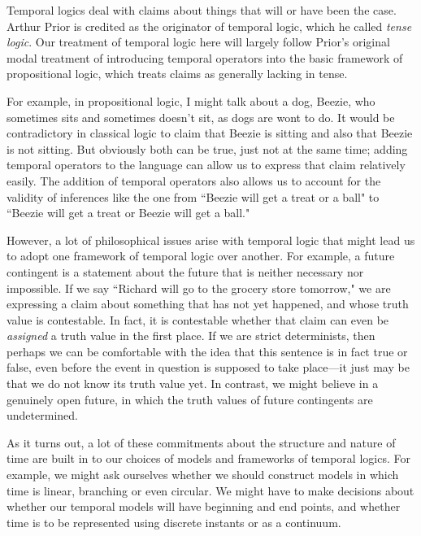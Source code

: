 \documentclass[../../../include/open-logic-section]{subfiles}
\begin{document}


Temporal logics deal with claims about things that will or have been
the case. Arthur Prior is credited as the originator of temporal
logic, which he called \emph{tense logic}. Our treatment of temporal
logic here will largely follow Prior's original modal treatment of
introducing temporal operators into the basic framework of
propositional logic, which treats claims as generally lacking in
tense.

For example, in propositional logic, I might talk about a dog, Beezie,
who sometimes sits and sometimes doesn't sit, as dogs are wont to do.
It would be contradictory in classical logic to claim that Beezie is
sitting and also that Beezie is not sitting. But obviously both can be
true, just not at the same time; adding temporal operators to the
language can allow us to express that claim relatively easily. The
addition of temporal operators also allows us to account for the
validity of inferences like the one from ``Beezie will get a treat or
a ball" to ``Beezie will get a treat or Beezie will get a ball." 

However, a lot of philosophical issues arise with temporal logic that
might lead us to adopt one framework of temporal logic over another.
For example, a future contingent is a statement about the future that
is neither necessary nor impossible. If we say ``Richard will go to the
grocery store tomorrow," we are expressing a claim about something that
has not yet happened, and whose truth value is contestable. In fact,
it is contestable whether that claim can even be \emph{assigned} a
truth value in the first place. If we are strict determinists, then
perhaps we can be comfortable with the idea that this sentence is in
fact true or false, even before the event in question is supposed to
take place---it just may be that we do not know its truth value yet.
In contrast, we might believe in a genuinely open future, in which the
truth values of future contingents are undetermined. 

As it turns out, a lot of these commitments about the structure and
nature of time are built in to our choices of models and frameworks of
temporal logics. For example, we might ask ourselves whether we should
construct models in which time is linear, branching or even circular.
We might have to make decisions about whether our temporal models will
have beginning and end points, and whether time is to be represented
using discrete instants or as a continuum. 
\end{document}
